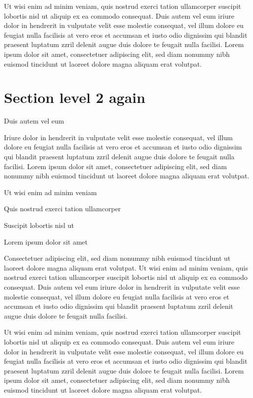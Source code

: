 \documentclass[11pt,twoside]{article}\makeatletter
\makeatletter
\renewcommand\section{\@startsection {section}{1}{\z@}%
     {-1.75ex \@plus -0.5ex \@minus -.2ex}%
     {0.5ex \@plus .2ex}%
     {\reset@font\Large\bfseries\sffamily}}
\def\DivI{\section}
\def\DivI{\chapter}
\makeatother
\begin{document}
Ut wisi enim ad minim veniam, quis nostrud exerci tation       ullamcorper suscipit lobortis nisl ut aliquip ex ea commodo       consequat. Duis autem vel eum iriure dolor in hendrerit in vulputate       velit esse molestie consequat, vel illum dolore eu feugiat nulla       facilisis at vero eros et accumsan et iusto odio dignissim qui blandit       praesent luptatum zzril delenit augue duis dolore te feugait nulla       facilisi. Lorem ipsum dolor sit amet, consectetuer adipiscing elit,       sed diam nonummy nibh euismod tincidunt ut laoreet dolore magna       aliquam erat volutpat. 
\DivI[Section level 2 again]{Section level 2 again}\par
Duis autem vel eum \par
Iriure dolor in hendrerit in vulputate velit esse molestie       consequat, vel illum dolore eu feugiat nulla facilisis at vero eros et       accumsan et iusto odio dignissim qui blandit praesent luptatum zzril       delenit augue duis dolore te feugait nulla facilisi. Lorem ipsum dolor       sit amet, consectetuer adipiscing elit, sed diam nonummy nibh euismod       tincidunt ut laoreet dolore magna aliquam erat volutpat. \par
Ut wisi enim ad minim veniam\par
Quis nostrud exerci tation ullamcorper \par
Suscipit lobortis nisl ut \par
Lorem ipsum dolor sit amet\par
Consectetuer adipiscing elit, sed diam nonummy nibh euismod       tincidunt ut laoreet dolore magna aliquam erat volutpat. Ut wisi enim       ad minim veniam, quis nostrud exerci tation ullamcorper suscipit       lobortis nisl ut aliquip ex ea commodo consequat. Duis autem vel eum       iriure dolor in hendrerit in vulputate velit esse molestie consequat,       vel illum dolore eu feugiat nulla facilisis at vero eros et accumsan       et iusto odio dignissim qui blandit praesent luptatum zzril delenit       augue duis dolore te feugait nulla facilisi.\par
Ut wisi enim ad minim veniam, quis nostrud exerci tation       ullamcorper suscipit lobortis nisl ut aliquip ex ea commodo       consequat. Duis autem vel eum iriure dolor in hendrerit in vulputate       velit esse molestie consequat, vel illum dolore eu feugiat nulla       facilisis at vero eros et accumsan et iusto odio dignissim qui blandit       praesent luptatum zzril delenit augue duis dolore te feugait nulla       facilisi. Lorem ipsum dolor sit amet, consectetuer adipiscing elit,       sed diam nonummy nibh euismod tincidunt ut laoreet dolore magna       aliquam erat volutpat. \par
\end{document}
